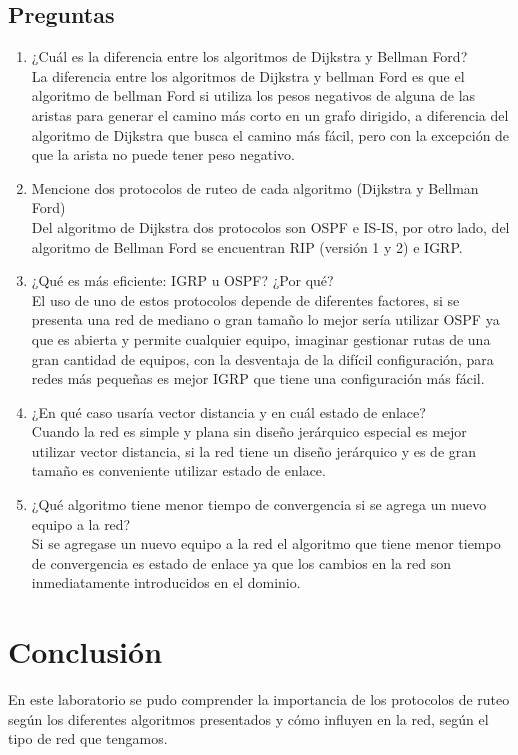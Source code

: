 \documentclass{article}
\begin{document}
\subsection{Preguntas\vspace{0.3cm}}
\begin{enumerate}
\item ¿Cuál es la diferencia entre los algoritmos de Dijkstra y Bellman Ford?\\
\newline La diferencia entre los algoritmos de Dijkstra y bellman Ford es que el algoritmo de bellman Ford si utiliza los pesos negativos de alguna de las aristas para generar el camino más corto en un grafo dirigido, a diferencia del algoritmo de Dijkstra que busca el camino más fácil, pero con la excepción de que la arista no puede tener peso negativo.

\item Mencione dos protocolos de ruteo de cada algoritmo (Dijkstra y Bellman Ford)\\
\newline Del algoritmo de Dijkstra dos protocolos son OSPF e IS-IS, por otro lado, del algoritmo de Bellman Ford se encuentran RIP (versión 1 y 2) e IGRP.

\item ¿Qué es más eficiente: IGRP u OSPF? ¿Por qué?\\
\newline El uso de uno de estos protocolos depende de diferentes factores, si se presenta una red de mediano o gran tamaño lo mejor sería utilizar OSPF ya que es abierta y permite cualquier equipo, imaginar gestionar rutas de una gran cantidad de equipos, con la desventaja de la difícil configuración, para redes más pequeñas es mejor IGRP que tiene una configuración más fácil.

\item ¿En qué caso usaría vector distancia y en cuál estado de enlace?\\
\newline Cuando la red es simple y plana sin diseño jerárquico especial es mejor utilizar vector distancia, si la red tiene un diseño jerárquico y es de gran tamaño es conveniente utilizar estado de enlace.

\item ¿Qué algoritmo tiene menor tiempo de convergencia si se agrega un nuevo equipo a la red?\\
\newline Si se agregase un nuevo equipo a la red el algoritmo que tiene menor tiempo de convergencia es estado de enlace ya que los cambios en la red son inmediatamente introducidos en el dominio.


\end{enumerate}

\newpage
\section{Conclusión \vspace{0.5cm}}
En este laboratorio se pudo comprender la importancia de los protocolos de ruteo según los diferentes algoritmos presentados y cómo influyen en la red, según el tipo de red que tengamos.
\end{document}
